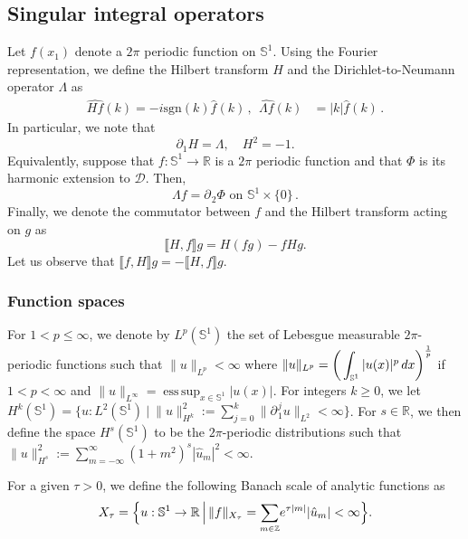 \documentclass[11pt]{article}
\theoremstyle{plain}
\theoremstyle{definition}
\theoremstyle{definition}
\DeclareMathOperator*{\esssup}{ess\,sup}
\def\bbZ{{\mathbb Z}}
\def\D{{\mathcal D}}
\def\p{\text{\bf\emph{p}}}
\def\ft #1{{\widehat{#1}}}
\def\p{{\partial\hspace{1pt}}}
\def\comm#1#2{{\llbracket#1,#2\rrbracket}}
\def\smallexp#1{{\text{\small #1}}}
\def\smallint#1#2{{\text{\small$\displaystyle{}\int_{#1}^{#2}$}}}
\begin{document}
\subsection{Singular integral operators}   Let $f(x_1)$ denote a $2\pi$ periodic function on $\mathbb{S}^1$.
Using the Fourier representation, we define the
Hilbert transform $H$ and the Dirichlet-to-Neumann operator $ \Lambda $ as
\begin{align}\label{Hilbert}
\ft{Hf}(k)=-i\text{sgn}(k) \ft{f}(k) \,, \ \
\ft{\Lambda f}(k)&=|k|\ft{f}(k)\,.
\end{align}
In particular, we note that
$$
\partial_1 H=\Lambda,\quad H^2=-1.
$$
Equivalently, suppose that $f:\mathbb{S}^1 \to \mathbb{R}  $ is a $2\pi$ periodic function and that $\Phi$ is its harmonic extension to $\D$.
Then,
\begin{equation}\label{Lambda_def}
\Lambda f= \p_2 \Phi \text{ \ on \ } \mathbb{S}^1\times\{0\} \,.
\end{equation}
Finally, we denote the commutator between $f$ and the Hilbert transform acting on $g$ as
$$
\comm{H}{f}g=H(fg)-fHg.
$$
Let us observe that $\comm{f}{H}g=-\comm{H}{f}g.$
\subsubsection{Function spaces}  For $1 < p \le \infty $, we denote by $L^p(\mathbb{S}^1)$ the set of Lebesgue measurable $2\pi$-periodic functions such that
$\|u\|_{L^p} < \infty $ where $\|u\|_{L^p} = \left(\smallint{\mathbb{S}^1}{}\, |u(x)|^p\,dx \right)^ {\frac{1}{p}} $ if $1< p< \infty $ and $\|u\|_{L^ \infty } = \esssup_{x\in \mathbb{S}^1} |u(x)|$.
For integers $k \ge 0  $,  we let $H^k(\mathbb{S}^1)=
\Big\{ u: L^2(\mathbb{S}^1)  \ \Big| \  \|u\|^2_{H^k}:= \sum\limits_{j=0}^k \|\p_{\!1}^j u\|_{L^2} < \infty \Big\}$.    For $s \in \mathbb{R}  $,  we then define the space $H^s(\mathbb{S}^1)$ to be
the  $2\pi$-periodic distributions such that
$  \|u\|^2_{H^s}:= \sum\limits_{m=- \infty}^ \infty (1+ m^2)^s |\hat u_m|^2 < \infty $.

For a given $\tau>0$, we define the following Banach scale of analytic functions as
\begin{equation}\label{X_tau}
X_\tau=\Big\{u: \mathbb{S}^1 \to \mathbb{R}  \,\Big|\,\|f\|_{X_\tau} = \smallexp{$\sum\limits_{m\in\bbZ}$} e^{\tau|m|}|\hat{u}_m|<\infty\Big\}.
\end{equation}
\end{document}
